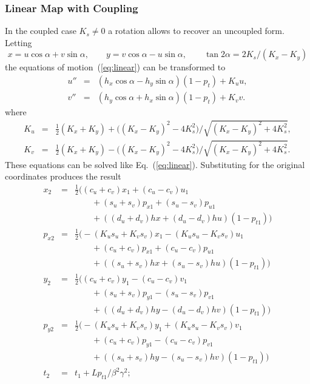 \documentclass{report}
\begin{document}
\subsubsection{Linear Map with Coupling}
In the coupled case $K_s \ne 0$ a rotation allows to recover an uncoupled
form. Letting 
\begin{equation}
  x = u \cos\alpha + v \sin\alpha, \qquad
  y = v \cos\alpha - u \sin\alpha, \qquad
  \tan 2\alpha = 2 K_s / (K_x - K_y)
\end{equation}
the equations of motion~(\ref{eq:linear}) can be transformed to
\begin{equation}
  \begin{array}{lcl}
  u'' &=& (h_x \cos\alpha - h_y \sin\alpha) (1 - p_t) + K_u u, \\
  v'' &=& (h_y \cos\alpha + h_x \sin\alpha) (1 - p_t) + K_v v.
  \end{array}
\end{equation}
where
\begin{equation}
  \begin{array}{lcl}
    K_u &=& \frac{1}{2}(K_x + K_y) +
    \bigg((K_x - K_y)^2 - 4 K_s^2\bigg)\bigg/\sqrt{(K_x - K_y)^2 + 4 K_s^2}, \\
    K_v &=& \frac{1}{2}(K_x + K_y) -
    \bigg((K_x - K_y)^2 - 4 K_s^2\bigg)\bigg/\sqrt{(K_x - K_y)^2 + 4 K_s^2}.
  \end{array}
\end{equation}
These equations can be solved like Eq.~(\ref{eq:linear}).
Substituting for the original coordinates produces the result
\begin{equation}
  \begin{array}{lcl}
    x_2 &=& \frac{1}{2}
    \bigg((c_u + c_v) x_1 + (c_u - c_v) u_1 \\
      &&\qquad+ (s_u + s_v) p_{x1} + (s_u - s_v) p_{u1} \\
      &&\qquad+ ((d_u + d_v) hx + (d_u - d_v) hu) (1 - p_{t1})\bigg) \\
    p_{x2} &=& \frac{1}{2}
    \bigg(- (K_u s_u + K_v s_v) x_1 - (K_u s_u - K_v s_v) u_1 \\
      &&\qquad+ (c_u + c_v) p_{x1} + (c_u - c_v) p_{u1} \\
      &&\qquad+ ((s_u + s_v) hx + (s_u - s_v) hu) (1 - p_{t1})\bigg) \\
    y_2 &=& \frac{1}{2}
    \bigg((c_u + c_v) y_1 - (c_u - c_v) v_1 \\
      &&\qquad+ (s_u + s_v) p_{y1} - (s_u - s_v) p_{v1} \\
      &&\qquad+ ((d_u + d_v) hy - (d_u - d_v) hv) (1 - p_{t1})\bigg) \\
    p_{y2} &=& \frac{1}{2}
    \bigg(- (K_u s_u + K_v s_v) y_1 + (K_u s_u - K_v s_v) v_1 \\
      &&\qquad+ (c_u + c_v) p_{y1} - (c_u - c_v) p_{v1} \\
      &&\qquad+ ((s_u + s_v) hy - (s_u - s_v) hv) (1 - p_{t1})\bigg) \\
    t_2 &=& t_1 + L p_{t1} / \beta^2\gamma^2;
  \end{array}
\end{equation}
\end{document}
